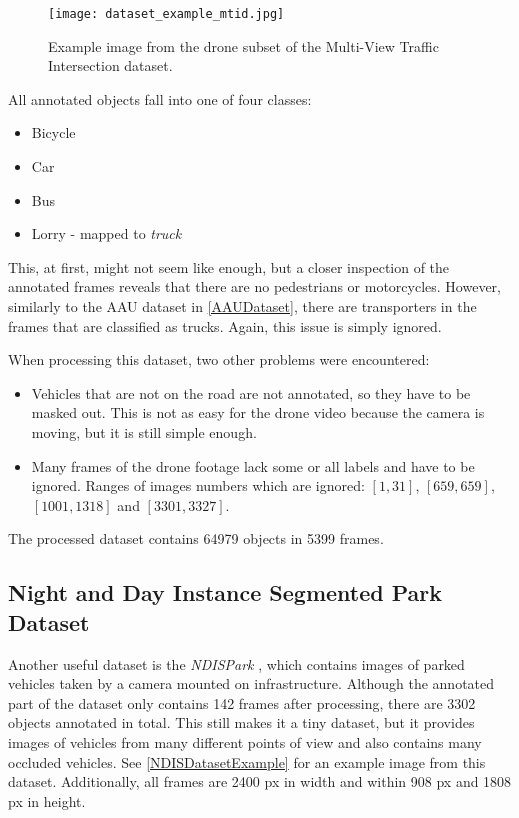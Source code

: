 \begin{figure}[h]
    \centering
    \texttt{[image: dataset\_example\_mtid.jpg]}
    \caption{Example image from the drone subset of the Multi-View Traffic Intersection dataset.}
    \label{MTIDDatasetExample}
\end{figure}

All annotated objects fall into one of four classes:
\begin{itemize}
    \item Bicycle
    \item Car
    \item Bus
    \item Lorry - mapped to \textit{truck}
\end{itemize}
This, at first, might not seem like enough, but a closer inspection of the
annotated frames reveals that there are no pedestrians or motorcycles. However,
similarly to the AAU dataset in \autoref{AAUDataset}, there are transporters in the frames
that are classified as trucks. Again, this issue is simply ignored.

When processing this dataset, two other problems were encountered:
\begin{itemize}
    \item Vehicles that are not on the road are not annotated, so they have to
    be masked out. This is not as easy for the drone video because the camera is
    moving, but it is still simple enough.
    \item Many frames of the drone footage lack some or all labels and have to
    be ignored. Ranges of images numbers which are ignored: $[1,31]$,
    $[659,659]$, $[1001,1318]$ and $[3301,3327]$.
\end{itemize}
The processed dataset contains \num{64979} objects in \num{5399} frames.


\subsection{Night and Day Instance Segmented Park Dataset}

Another useful dataset is the \textit{NDISPark} \cite{Luca2022}, which contains
images of parked vehicles taken by a camera mounted on infrastructure. Although
the annotated part of the dataset only contains \num{142} frames after
processing, there are \num{3302} objects annotated in total. This still makes it
a tiny dataset, but it provides images of vehicles from many different points of
view and also contains many occluded vehicles. See \autoref{NDISDatasetExample}
for an example image from this dataset. Additionally, all frames are \num{2400}
px in width and within \num{908} px and \num{1808} px in height.

